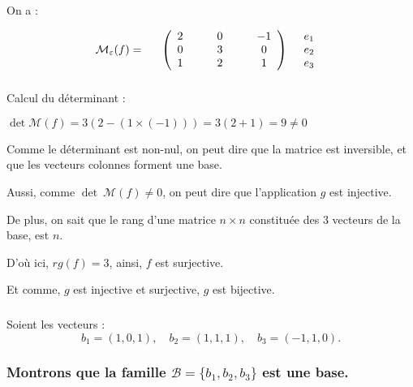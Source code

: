\documentclass[a4paper,12pt]{article}
\begin{document}
\subsubsection{}

On a :

\[
  \mathcal{M}_{\varepsilon}(f)=
  \begin{array}{ccc}
    &\left(\begin{array}{c@{\hspace*{3em}}c@{\hspace*{3em}}c}
            2 & 0 & -1 \\
            0 & 3 & 0  \\
            1 & 2 & 1
          \end{array} \right) 
    & \begin{array}{c} e_1\\ e_2 \\ e_3 \end{array}
  \end{array}
\]

\subsubsection{}

Calcul du déterminant :

$\det \mathcal{M}(f) = 3(2-(1\times(-1))) = 3(2+1) = 9 \neq 0$

Comme le déterminant est non-nul, on peut dire que la matrice est inversible, et que les vecteurs colonnes forment une base.

Aussi, comme $\det\ \mathcal{M}(f) \neq 0$, on peut dire que l'application $g$ est injective.

De plus, on sait que le rang d'une matrice $n\times n$ constituée des 3 vecteurs de la base, est $n$. %

D'où ici, $rg(f)=3$, ainsi, $f$ est surjective.

Et comme, $g$ est injective et surjective, $g$ est bijective.

\subsubsection{}

Soient les vecteurs : \[ b_1=(1,0,1),\quad b_2=(1,1,1),\quad b_3=(-1,1,0).\]

\subsubsection{Montrons que la famille $\mathcal{B}=\{b_1,b_2,b_3\}$ est une base.}
\end{document}
